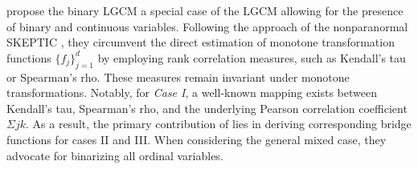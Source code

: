 

\citet{Fan17} propose the binary LGCM a special case of the LGCM allowing for the presence of binary and continuous variables. Following the approach of the nonparanormal SKEPTIC \citep{Liu12}, they circumvent the direct estimation of monotone transformation functions $\{f_j\}_{j=1}^d$ by employing rank correlation measures, such as Kendall's tau or Spearman's rho. These measures remain invariant under monotone transformations. Notably, for \textit{Case I}, a well-known mapping exists between Kendall's tau, Spearman's rho, and the underlying Pearson correlation coefficient $\Sigma{jk}$. As a result, the primary contribution of \citet{Fan17} lies in deriving corresponding bridge functions for cases II and III. When considering the general mixed case, they advocate for binarizing all ordinal variables.


